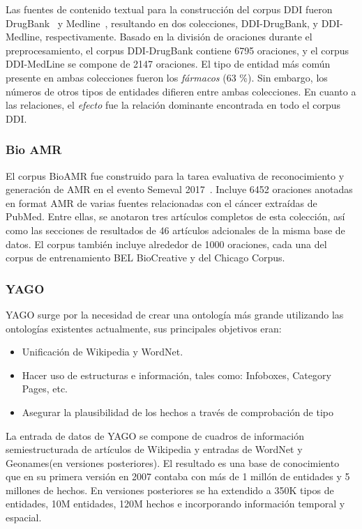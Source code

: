 Las fuentes de contenido textual para la construcción del corpus DDI fueron DrugBank~\cite{} y Medline~\cite{}, resultando en dos colecciones, DDI-DrugBank, y DDI-Medline, respectivamente.
Basado en la división de oraciones durante el preprocesamiento, el corpus DDI-DrugBank contiene 6795 oraciones, y el corpus DDI-MedLine se compone de 2147 oraciones.
El tipo de entidad más común presente en ambas colecciones fueron los \textit{fármacos} (63 \%).
Sin embargo, los números de otros tipos de entidades difieren entre ambas colecciones.
En cuanto a las relaciones, el \textit{efecto} fue la relación dominante encontrada en todo el corpus DDI.

\subsubsection*{Bio AMR}

El corpus BioAMR fue construido para la tarea evaluativa de reconocimiento y generación de AMR en el evento Semeval 2017~\cite{}.
Incluye 6452 oraciones anotadas en format AMR de varias fuentes relacionadas con el cáncer extraídas de PubMed.
Entre ellas, se anotaron tres artículos completos de esta colección, así como las secciones de resultados de 46 artículos adcionales de la misma base de datos.
El corpus también incluye alrededor de 1000 oraciones, cada una del corpus de entrenamiento BEL BioCreative y del Chicago Corpus.

\subsubsection*{YAGO}

YAGO surge por la necesidad de crear una ontología más grande utilizando las ontologías existentes actualmente, sus principales objetivos eran:
\begin{itemize}
  \item Unificación de Wikipedia y WordNet.
  \item Hacer uso de estructuras e información, tales como: Infoboxes, Category Pages, etc.
  \item Asegurar la plausibilidad de los hechos a través de comprobación de tipo
\end{itemize}

La entrada de datos de YAGO se compone de cuadros de información semiestructurada de artículos de Wikipedia y entradas de WordNet y Geonames(en versiones posteriores).
El resultado es una base de conocimiento que en su primera versión en 2007 contaba con más de 1 millón de entidades y 5 millones de hechos.
En versiones posteriores se ha extendido a 350K tipos de entidades, 10M entidades, 120M hechos e incorporando información temporal y espacial.

